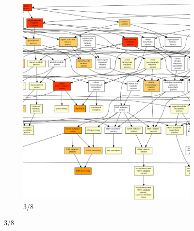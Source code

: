\begin{figure}[p]
\ContinuedFloat
\begin{subfigure}{\textwidth}
\includegraphics[width=\textwidth]
{Figures/hlc-go-all-graph/hlc-go-all-graph_2.png}
\caption{3/8}
\end{subfigure}
\end{figure}

